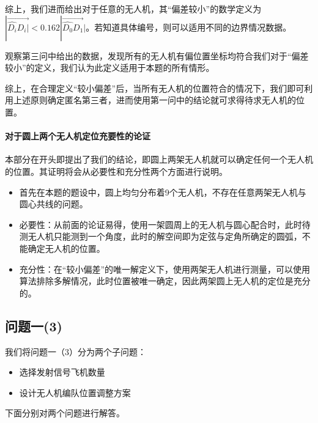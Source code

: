 \documentclass[withoutpreface,bwprint]{cumcmthesis} %
\begin{document}
			综上，我们进而给出对于任意的无人机，其“偏差较小”的数学定义为$|\overrightarrow{\widehat{D_i}D_i|}<0.162|\overrightarrow{\widehat{D_0}D_1}|$。若知道具体编号，则可以适用不同的边界情况数据。
			
			观察第三问中给出的数据，发现所有的无人机有偏位置坐标均符合我们对于“偏差较小”的定义，我们认为此定义适用于本题的所有情形。
			
			综上，在合理定义“较小偏差”后，当所有无人机的位置符合的情况下，我们即可利用上述原则确定匿名第三者，进而使用第一问中的结论就可求得待求无人机的位置。
			
			\paragraph{对于圆上两个无人机定位充要性的论证}
			本部分在开头即提出了我们的结论，即圆上两架无人机就可以确定任何一个无人机的位置。其证明将会从必要性和充分性两个方面进行说明。
			\begin{itemize}
				\item	首先在本题的题设中，圆上均匀分布着9个无人机，不存在任意两架无人机与圆心共线的问题。
				\item	必要性：从前面的论证易得，使用一架圆周上的无人机与圆心配合时，此时待测无人机只能测到一个角度，此时的解空间即为定弦与定角所确定的圆弧，不能确定无人机的位置。
				\item	充分性：在“较小偏差”的唯一解定义下，使用两架无人机进行测量，可以使用算法排除多解情况，此时位置被唯一确定，因此两架圆上无人机的定位是充分的。
			\end{itemize}
			
		\subsection{问题一(3)}
			\par 我们将问题一（3）分为两个子问题：
			\begin{itemize}
				\item 选择发射信号飞机数量
				\item 设计无人机编队位置调整方案
			\end{itemize}
			下面分别对两个问题进行解答。
\end{document}
